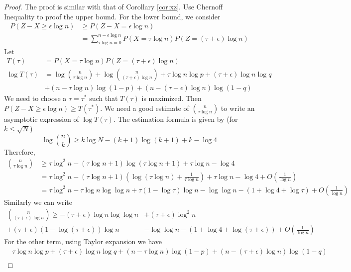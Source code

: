 \documentclass{article}
\begin{document}
\begin{proof}
	The proof is similar with that of Corollary \ref{cor:xz}.
	Use Chernoff Inequality to proof the upper bound. For the lower bound, we consider
	\begin{align*}
	P(Z - X \geq \epsilon \log n) & \geq P(Z - X = \epsilon \log n) \\
	& = \sum_{\tau \log n = 0}^{n - \epsilon \log n} P(X = \tau \log n) P(Z = (\tau + \epsilon) \log n)
	\end{align*}
	Let
	\begin{align*}
	T(\tau) &= P(X = \tau \log n) P(Z = (\tau + \epsilon) \log n) \\ 
	\log T(\tau) & = \log \binom{n}{\tau \log n} +  \log \binom{n}{(\tau + \epsilon) \log n}
    +  \tau \log n \log p + (\tau + \epsilon) \log n \log q \\
    &+ (n - \tau \log n) \log (1 - p)
    + (n - (\tau + \epsilon) \log n ) \log (1 - q )
	\end{align*}
	We need to choose a $\tau=\tau^*$ such that $T(\tau)$ is maximized. Then
	$ P(Z - X \geq \epsilon \log n) \geq T(\tau^*)$.
	We need a good estimate of $\binom{n}{\tau \log n}$ to write an asymptotic expression of $\log T(\tau)$.
	The estimation formula is given by (for $k\leq \sqrt{N}$)
	$$
	\log \binom{n}{k} \geq k \log N - (k+1) \log (k+1) + k - \log 4
	$$
	Therefore,
	\begin{align*}
	\binom{n}{\tau \log n} &\geq \tau \log^2 n - (\tau \log n + 1)\log(\tau \log n + 1) + \tau \log n  - \log 4 \\
	&=  \tau \log^2 n - (\tau \log n + 1)(\log(\tau \log n) + \frac{1}{\tau \log n}) + \tau \log n  - \log 4 + O(\frac{1}{\log n}) \\
	& = \tau \log^2 n - \tau \log n\log\log n + \tau (  1 - \log \tau)\log n - \log\log n- (1 + \log 4 + \log \tau)  + O(\frac{1}{\log n}) 
	\end{align*}
	Similarly we can write
	\begin{align*}
	\binom{n}{(\tau + \epsilon) \log n} \geq -(\tau + \epsilon) \log n\log\log n & +(\tau + \epsilon) \log^2 n\\
	+ (\tau + \epsilon) (1-\log (\tau + \epsilon) )\log n &- \log\log n - (1 + \log 4 + \log (\tau+\epsilon))  + O(\frac{1}{\log n}) 
	\end{align*}
	For the other term, using Taylor expansion we have
	\begin{align*}
	& \tau \log n \log p + (\tau + \epsilon) \log n \log q 
    + (n - \tau \log n) \log (1 - p)
    + (n - (\tau + \epsilon) \log n ) \log (1 - q ) \\

\end{align*}
\end{proof}
\end{document}
